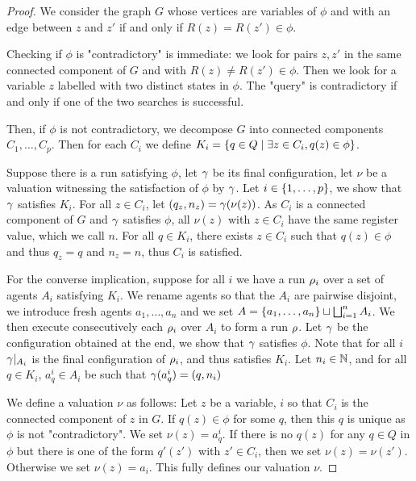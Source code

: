 \begin{proof}
	We consider the graph $G$ whose vertices are variables of $\phi$ and with an edge between $z$ and $z'$ if and only if $R(z) = R(z') \in \phi$.
	
	Checking if $\phi$ is "contradictory" is immediate: we look for pairs $z, z'$ in the same connected component of $G$ and with $R(z) \neq R(z') \in \phi$.
	Then we look for a variable $z$ labelled with two distinct states in $\phi$. The "query" is contradictory if and only if one of the two searches is successful.
	
	Then, if $\phi$ is not contradictory, we decompose $G$ into connected components $C_1, \ldots, C_p$.
	Then for each $C_i$ we define $K_i = \{q \in Q \mid \exists z \in C_i, q(z) \in \phi\}$.  
	
	Suppose there is a run satisfying $\phi$, let $\gamma$ be its final configuration, let $\nu$ be a valuation witnessing the satisfaction of $\phi$ by $\gamma$.
	Let $i \in \{1,\ldots, p\}$, we show that $\gamma$ satisfies $K_i$. For all $z \in C_i$, let $(q_z,n_z) = \gamma(\nu(z))$. As $C_i$ is a connected component of $G$ and $\gamma$ satisfies $\phi$, all $\nu(z)$ with $z \in C_i$ have the same register value, which we call $n$. 
	For all $q \in K_i$, there exists $z \in C_i$ such that $q(z) \in \phi$ and thus $q_z =q$ and $n_z =n$, thus $C_i$ is satisfied.
	
	For the converse implication, suppose for all $i$ we have a run $\rho_i$ over a set of agents $A_i$ satisfying $K_i$. We rename agents so that the $A_i$ are pairwise disjoint, we introduce fresh agents $a_1, \ldots, a_n$ and we set $A = \{a_1, \ldots, a_n\} \sqcup \bigsqcup_{i=1}^n A_i$. We then execute consecutively each $\rho_i$ over $A_i$ to form a run $\rho$. Let $\gamma$ be the configuration obtained at the end, we show that $\gamma$ satisfies $\phi$. Note that for all $i$ $\gamma|_{A_i}$ is the final configuration of $\rho_i$, and thus satisfies $K_i$. Let $n_i \in \mathbb{N}$, and for all $q \in K_i$, $a_q^i \in A_i$ be such that $\gamma(a_q^i) = (q, n_i)$
	
	We define a valuation $\nu$ as follows: Let $z$ be a variable, $i$ so that $C_i$ is the connected component of $z$ in $G$. If $q(z) \in \phi$ for some $q$, then this $q$ is unique as $\phi$ is not "contradictory". We set $\nu(z) = a_q^i$.
	If there is no $q(z)$ for any $q \in Q$ in $\phi$ but there is one of the form $q'(z')$ with $z' \in C_i$, then we set $\nu(z) = \nu(z')$.
	Otherwise we set $\nu(z) = a_i$.
	This fully defines our valuation $\nu$.
	

\end{proof}
